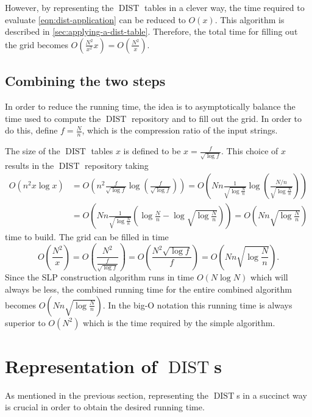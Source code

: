 \documentclass[twoside,11pt,openright]{report}
\newcommand{\DIST}{\operatorname{DIST}}
\begin{document}
However, by representing the $\DIST$ tables in a clever way, the time required to evaluate \cref{eqn:dist-application} can be reduced to $O(x)$. This algorithm is described in \cref{sec:applying-a-dist-table}. Therefore, the total time for filling out the grid becomes $O\left( \frac{N^2}{x^2}x \right) = O\left( \frac{N^2}{x} \right)$.

\subsection{Combining the two steps}
In order to reduce the running time, the idea is to asymptotically balance the time used to compute the $\DIST$ repository and to fill out the grid. In order to do this, define $f = \frac{N}{n}$, which is the compression ratio of the input strings.

The size of the $\DIST$ tables $x$ is defined to be $x = \frac{f}{\sqrt{\log{f}}}$. This choice of $x$ results in the $\DIST$ repository taking
\begin{align*}
  O(n^2 x\log{x})
    &= O\left( n^2 \frac{f}{\sqrt{\log{f}}} \log\left( \frac{f}{\sqrt{\log{f}}} \right) \right)
    = O\left( Nn \frac{1}{\sqrt{\log{\frac{N}{n}}}} \log\left( \frac{N/n}{\sqrt{\log{\frac{N}{n}}}} \right) \right) \\
    &= O\left( Nn \frac{1}{\sqrt{\log{\frac{N}{n}}}} \left( \log{\frac{N}{n}} - \log{\sqrt{\log{\frac{N}{n}}}} \right) \right)
    = O\left( Nn\sqrt{\log{\frac{N}{n}}} \right)
\end{align*}
time to build. The grid can be filled in time
\[
  O\left(\frac{N^2}{x}\right)
    = O\left( \frac{N^2}{\frac{f}{\sqrt{\log{f}}}} \right)
    = O\left( \frac{N^2 \sqrt{\log{f}}}{f} \right)
    = O\left( Nn\sqrt{\log{\frac{N}{n}}} \right).
\]
Since the SLP construction algorithm runs in time $O(N\log{N})$ which will always be less, the combined running time for the entire combined algorithm becomes $O\left( Nn\sqrt{\log{\frac{N}{n}}} \right)$. In the big-O notation this running time is always superior to $O(N^2)$ which is the time required by the simple algorithm.

\section{Representation of $\DIST$s}
As mentioned in the previous section, representing the $\DIST$s in a succinct way is crucial in order to obtain the desired running time.
\end{document}

